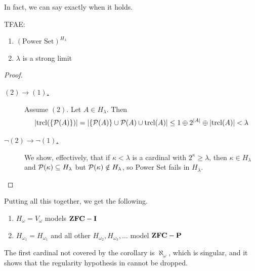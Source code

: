 In fact, we can say exactly when it holds.

\begin{boxlemma} \label{Ch3:Lemma:H_Kappa_Power_Set}
    TFAE:
    \begin{enumerate}[label = (\arabic*)]
        \item $(\text{Power Set})^{H_{\lambda}}$
        \item $\lambda$ is a strong limit
    \end{enumerate}
\end{boxlemma}
\begin{proof} \hfill
    \begin{description}
        \item[\underline{$(2) \to (1)$.}] Assume $(2)$. Let $A \in H_{\lambda}$. Then
        \begin{align*}
            \left\lvert \operatorname{trcl}\!\left( \left\{ \mathcal{P}(A) \right\} \right) \right\rvert
            = \left\lvert \left\{ \mathcal{P}(A) \right\} \cup \mathcal{P}(A) \cup \operatorname{trcl}\!\left( A \right) \right\rvert
            \leq 1 \oplus 2^{\left\lvert A \right\rvert} \oplus \left\lvert \operatorname{trcl}\!\left( A \right) \right\rvert
            < \lambda
        \end{align*}

        \item[\underline{$\neg(2) \to \neg(1)$.}] We show, effectively, that if $\kappa < \lambda$ is a cardinal with $2^{\kappa} \geq \lambda$, then $\kappa \in H_{\lambda}$ and $\mathcal{P}(\kappa) \subseteq H_{\lambda}$ but $\mathcal{P}(\kappa) \notin H_{\lambda}$, so Power Set fails in $H_{\lambda}$.
    \end{description}
\end{proof}

Putting all this together, we get the following.

\begin{boxcorollary} \hfill
    \begin{enumerate}
        \item $H_{\omega} = V_{\omega}$ models $\mathbf{ZFC} - \mathbf{I}$
        \item $H_{\omega_1} = H_{\omega_1}$ and all other $H_{\omega_2}, H_{\omega_3}, \ldots$ model $\mathbf{ZFC} - \mathbf{P}$
    \end{enumerate}
\end{boxcorollary}

The first cardinal not covered by the corollary is $\aleph_{\omega}$, which is singular, and it shows that the regularity hypothesis in  cannot be dropped.

